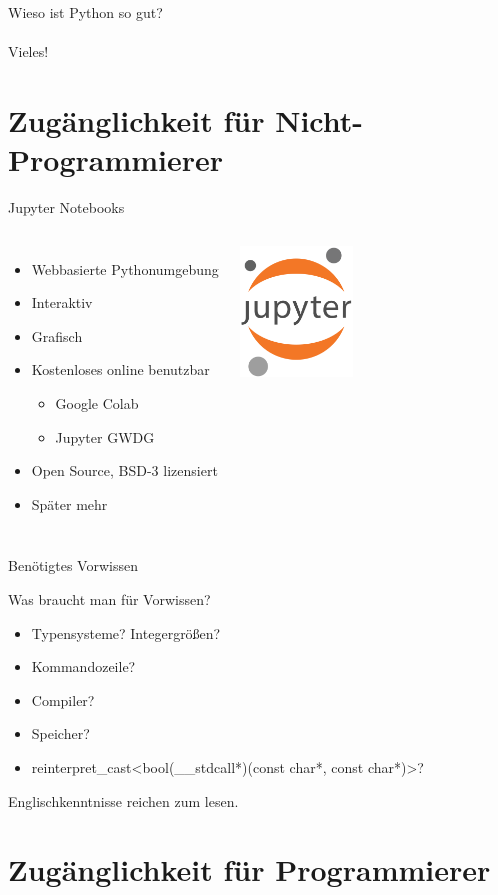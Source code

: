 \documentclass{beamer}
\begin{document}
\begin{frame}
\begin{center}
{ \Huge Wieso ist Python so gut?}\\~\\
\pause
Vieles!
\end{center}
\end{frame}

\section{Zug\"anglichkeit f\"ur Nicht-Programmierer}

\begin{frame}{Jupyter Notebooks}
\begin{columns}[onlytextwidth,T]
\column{\dimexpr\linewidth-30mm-5mm}
\begin{itemize}
\item Webbasierte Pythonumgebung
\item Interaktiv
\item Grafisch
\item Kostenloses online benutzbar
\begin{itemize}
\item Google Colab
\item Jupyter GWDG
\end{itemize}
\item Open Source, BSD-3 lizensiert
\item Sp\"ater mehr
\end{itemize}
\column{30mm}
\includegraphics[width=30mm]{./assets/jupyter.png}
\end{columns}
\end{frame}

\begin{frame}{Ben\"otigtes Vorwissen}
\begin{center}
\LARGE Was braucht man f\"ur Vorwissen?
\end{center}
\begin{itemize}
\item Typensysteme? Integergr\"o\ss{}en?
\item Kommandozeile?
\item Compiler?
\item Speicher?
\item reinterpret\_cast\textless bool(\_\_stdcall*)(const char*, const char*)\textgreater?
\end{itemize}
\begin{center}
\Large Englischkenntnisse reichen zum lesen.
\end{center}
\end{frame}

\section{Zug\"anglichkeit f\"ur Programmierer}
\end{document}
